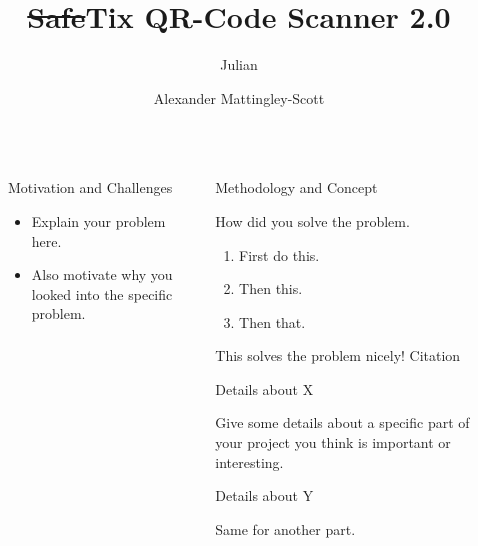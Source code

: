 \documentclass[final,dvipsnames]{beamer}
\title{\sout{Safe}Tix QR-Code Scanner 2.0}
\author{Julian \inst{1} \and Alexander Mattingley-Scott \inst{1}}
\institute[shortinst]{\inst{1} Heidelberg University}
\newlength{\sepwidth}
\newlength{\colwidth}
\newcommand{\separatorcolumn}{\begin{column}{\sepwidth}\end{column}}
\begin{document}
\begin{frame}[t, fragile]
\begin{columns}[t]
\separatorcolumn

\begin{column}{\colwidth}

	\begin{block}{Motivation and Challenges}

		\begin{itemize}
			\item Explain your problem here. 
			\item Also motivate why you looked into the specific problem.
		\end{itemize}

	\end{block}


\end{column}

\separatorcolumn

\begin{column}{\colwidth}

	\begin{alertblock}{Methodology and Concept}

		How did you solve the problem.

		\begin{enumerate}
				\item First do this.
				\item Then this.
				\item Then that.
		\end{enumerate}

		This solves the problem nicely! Citation\cite{goli_resprop_2020}

	\end{alertblock}

	\begin{block}{Details about X}

		Give some details about a specific part of your project you think is
		important or interesting.

	\end{block}

	\begin{block}{Details about Y}

		Same for another part.

	\end{block}

\end{column}

\separatorcolumn


\end{columns}
\end{frame}
\end{document}
